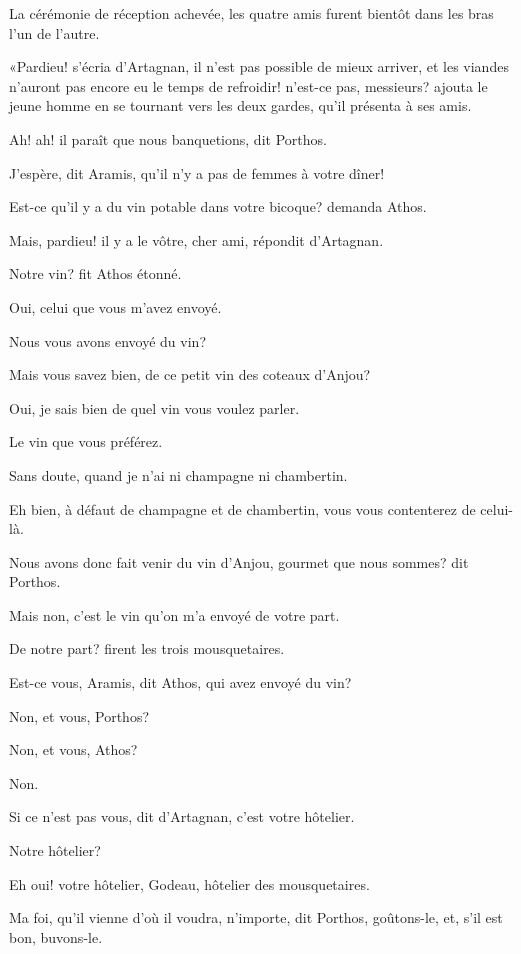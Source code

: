 La cérémonie de réception achevée, les quatre amis furent bientôt dans les bras l'un de l'autre. 

«Pardieu! s'écria d'Artagnan, il n'est pas possible de mieux arriver, et les viandes n'auront pas encore eu le temps de refroidir! n'est-ce pas, messieurs? ajouta le jeune homme en se tournant vers les deux gardes, qu'il présenta à ses amis. 

\speak  Ah! ah! il paraît que nous banquetions, dit Porthos. 

\speak  J'espère, dit Aramis, qu'il n'y a pas de femmes à votre dîner! 

\speak  Est-ce qu'il y a du vin potable dans votre bicoque? demanda Athos. 

\speak  Mais, pardieu! il y a le vôtre, cher ami, répondit d'Artagnan. 

\speak  Notre vin? fit Athos étonné. 

\speak  Oui, celui que vous m'avez envoyé. 

\speak  Nous vous avons envoyé du vin? 

\speak  Mais vous savez bien, de ce petit vin des coteaux d'Anjou? 

\speak  Oui, je sais bien de quel vin vous voulez parler. 

\speak  Le vin que vous préférez. 

\speak  Sans doute, quand je n'ai ni champagne ni chambertin. 

\speak  Eh bien, à défaut de champagne et de chambertin, vous vous contenterez de celui-là. 

\speak  Nous avons donc fait venir du vin d'Anjou, gourmet que nous sommes? dit Porthos. 

\speak  Mais non, c'est le vin qu'on m'a envoyé de votre part. 

\speak  De notre part? firent les trois mousquetaires. 

\speak  Est-ce vous, Aramis, dit Athos, qui avez envoyé du vin? 

\speak  Non, et vous, Porthos? 

\speak  Non, et vous, Athos? 

\speak  Non. 

\speak  Si ce n'est pas vous, dit d'Artagnan, c'est votre hôtelier. 

\speak  Notre hôtelier? 

\speak  Eh oui! votre hôtelier, Godeau, hôtelier des mousquetaires. 

\speak  Ma foi, qu'il vienne d'où il voudra, n'importe, dit Porthos, goûtons-le, et, s'il est bon, buvons-le. 

